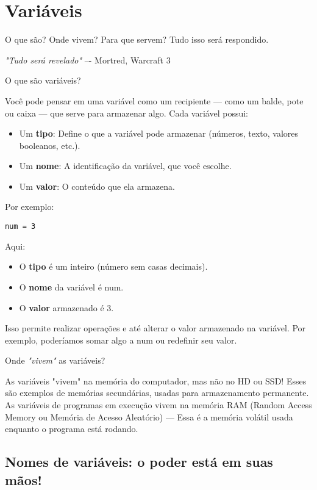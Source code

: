 \documentclass[12pt]{book}
\begin{document}
	\section{Variáveis}
	
	O que são? Onde vivem? Para que servem? Tudo isso será respondido.
	
	\hspace*{12mm}\textit{"Tudo será revelado"} –- Mortred, Warcraft 3\newline
	
	O que são variáveis?
	
	Você pode pensar em uma variável como um recipiente — como um balde, pote ou caixa — que serve para armazenar algo. Cada variável possui:
	
	\begin{itemize}
	\item Um \textbf{tipo}: Define o que a variável pode armazenar (números, texto, valores booleanos, etc.).
	\item Um \textbf{nome}: A identificação da variável, que você escolhe.
	\item Um \textbf{valor}: O conteúdo que ela armazena.
	\end{itemize}
	Por exemplo: 
	\begin{lstlisting}[caption={código simples}]
num = 3\end{lstlisting}
	
	Aqui:
	
	\begin{itemize}
		\item O \textbf{tipo} é um inteiro (número sem casas decimais).
		\item O \textbf{nome} da variável é num.
		\item O \textbf{valor} armazenado é 3.
	\end{itemize}
	
	
	Isso permite realizar operações e até alterar o valor armazenado na variável. Por exemplo, poderíamos somar algo a num ou redefinir seu valor.
	
	Onde \textit{"vivem"} as variáveis?
	
	As variáveis "vivem" na memória do computador, mas não no HD ou SSD! Esses são exemplos de memórias secundárias, usadas para armazenamento permanente. As variáveis de programas em execução vivem na memória RAM (Random Access Memory ou Memória de Acesso Aleatório) --- Essa é a memória volátil usada enquanto o programa está rodando.
	
	\subsection{Nomes de variáveis: o poder está em suas mãos!}
	
\end{document}
